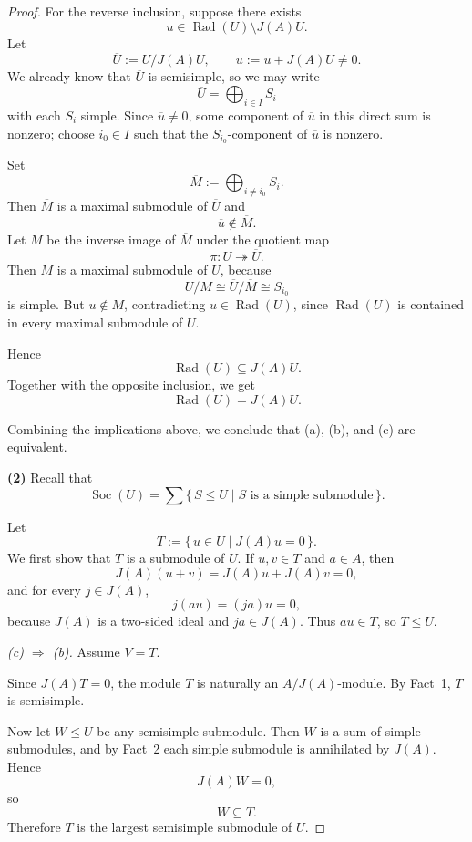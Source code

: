 \begin{proof}
    For the reverse inclusion, suppose there exists
    \[
        u\in \operatorname{Rad}(U)\setminus J(A)U.
    \]
    Let
    \[
        \overline{U}:=U/J(A)U,\qquad \overline{u}:=u+J(A)U\neq 0.
    \]
    We already know that $\overline{U}$ is semisimple, so we may write
    \[
        \overline{U}=\bigoplus_{i\in I} S_i
    \]
    with each $S_i$ simple. Since $\overline{u}\neq 0$, some component of $\overline{u}$ in
    this direct sum is nonzero; choose $i_0\in I$ such that the $S_{i_0}$-component of
    $\overline{u}$ is nonzero.

    Set
    \[
        \overline{M}:=\bigoplus_{i\neq i_0} S_i.
    \]
    Then $\overline{M}$ is a maximal submodule of $\overline{U}$ and
    \[
        \overline{u}\notin \overline{M}.
    \]
    Let $M$ be the inverse image of $\overline{M}$ under the quotient map
    \[
        \pi:U\twoheadrightarrow \overline{U}.
    \]
    Then $M$ is a maximal submodule of $U$, because
    \[
        U/M\cong \overline{U}/\overline{M}\cong S_{i_0}
    \]
    is simple. But $u\notin M$, contradicting $u\in \operatorname{Rad}(U)$, since
    $\operatorname{Rad}(U)$ is contained in every maximal submodule of $U$.

    Hence
    \[
        \operatorname{Rad}(U)\subseteq J(A)U.
    \]
    Together with the opposite inclusion, we get
    \[
        \operatorname{Rad}(U)=J(A)U.
    \]

    Combining the implications above, we conclude that \textup{(a)}, \textup{(b)}, and
    \textup{(c)} are equivalent.

    \bigskip

    \noindent
    \textbf{(2)} Recall that
    \[
        \operatorname{Soc}(U)=\sum \{\,S\leq U\mid S \text{ is a simple submodule}\,\}.
    \]

    Let
    \[
        T:=\{\,u\in U\mid J(A)u=0\,\}.
    \]
    We first show that $T$ is a submodule of $U$. If $u,v\in T$ and $a\in A$, then
    \[
        J(A)(u+v)=J(A)u+J(A)v=0,
    \]
    and for every $j\in J(A)$,
    \[
        j(au)=(ja)u=0,
    \]
    because $J(A)$ is a two-sided ideal and $ja\in J(A)$. Thus $au\in T$, so $T\leq U$.

    \medskip

    \noindent
    \textit{\textup{(c)} $\Rightarrow$ \textup{(b)}.}
    Assume $V=T$.

    Since $J(A)T=0$, the module $T$ is naturally an $A/J(A)$-module. By Fact~1, $T$ is
    semisimple.

    Now let $W\leq U$ be any semisimple submodule. Then $W$ is a sum of simple
    submodules, and by Fact~2 each simple submodule is annihilated by $J(A)$. Hence
    \[
        J(A)W=0,
    \]
    so
    \[
        W\subseteq T.
    \]
    Therefore $T$ is the largest semisimple submodule of $U$.


\end{proof}

